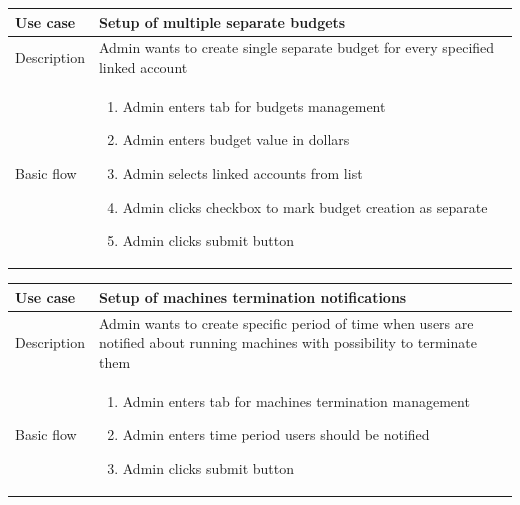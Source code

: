\documentclass[licencjacka,en]{thesisclass}
\begin{document}
    \begin{center}
      \begin{tabular} {| l | p{13cm} |}
      \hline
      Use case & Setup of multiple separate budgets \\ \hline
      Description & Admin wants to create single separate budget for every specified linked account \\ \hline
      Basic flow &
        \begin{enumerate}
        \item Admin enters tab for budgets management
        \item Admin enters budget value in dollars
        \item Admin selects linked accounts from list
        \item Admin clicks checkbox to mark budget creation as separate
        \item Admin clicks submit button
        \end{enumerate}
        \\ \hline
      \end{tabular}
    \end{center}

    \begin{center}
      \begin{tabular} {| l | p{13cm} |}
      \hline
      Use case & Setup of machines termination notifications \\ \hline
      Description & Admin wants to create specific period of time when users are notified about running machines with possibility to terminate them \\ \hline
      Basic flow &
        \begin{enumerate}
        \item Admin enters tab for machines termination management
        \item Admin enters time period users should be notified
        \item Admin clicks submit button
        \end{enumerate}
        \\ \hline
      \end{tabular}
    \end{center}
\end{document}
